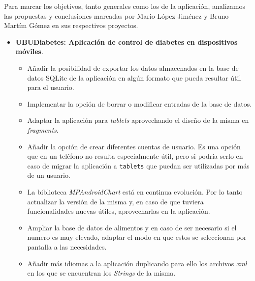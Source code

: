 
Para marcar los objetivos, tanto generales como los de la aplicación, analizamos las propuestas y conclusiones marcadas por Mario López Jiménez y Bruno Martím Gómez en sus respectivos proyectos.

\begin{itemize}
	\item  \textbf{UBUDiabetes: Aplicación de control de diabetes en dispositivos móviles}\cite{mario2016}.
	\begin{itemize}
		\item Añadir la posibilidad de exportar los datos almacenados en la base de datos SQLite de la aplicación en algún formato que pueda resultar útil para el usuario.
	\item Implementar la opción de borrar o modificar entradas de la base de datos.
	\item Adaptar la aplicación para \textit{tablets} aprovechando el diseño de la misma en \textit{fragments}.
	\item Añadir la opción de crear diferentes cuentas de usuario. Es una opción que en un teléfono no resulta especialmente útil, pero si podría serlo en caso de migrar la aplicación a  \texttt{tablets} que puedan ser utilizadas por más de un usuario.
	\item La biblioteca \textit{MPAndroidChart} está en continua evolución. Por lo tanto actualizar la versión de la misma y, en caso de que tuviera funcionalidades nuevas útiles, aprovecharlas en la aplicación.
	\item Ampliar la base de datos de alimentos y en caso de ser necesario si el numero es muy elevado, adaptar el modo en que 	estos se seleccionan por pantalla a las necesidades.
	\item Añadir más idiomas a la aplicación duplicando para ello los archivos \textit{xml} en los que se encuentran los \textit{Strings} de la misma.
	\end{itemize}
	

\end{itemize}
